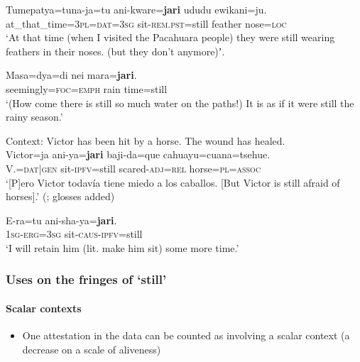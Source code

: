 \begin{exe}
	\ex\label{exAppendixCavinena1}
	\gll Tumepatya=tuna-ja=tu ani-kware=\textbf{jari} ududu ewikani=ju.\\
	at\_that\_time=3\textsc{pl}=\textsc{dat}=3\textsc{sg} sit-\textsc{rem}.\textsc{pst}=still feather nose=\textsc{loc}\\
	\glt \lq At that time (when I visited the Pacahuara people) they were still wearing feathers in their noses. (but they don’t anymore)ʼ. \parencite[590]{Guillaume2008}
	
	\ex\label{exAppendixCavinena2}
	 \gll Masa=dya=di nei mara=\textbf{jari}.\\
	seemingly=\textsc{foc}=\textsc{emph} rain time=still\\
	\glt \lq (How come there is still so much water on the paths!) It is as if it were still the rainy season.' \parencite[636]{Guillaume2008}

	\ex\label{exAppendixCavinena3}
Context: Victor has been hit by a horse. The wound has healed.\\
\gll Victor=ja ani-ya=\textbf{jari} baji-da=que cahuayu=cuana=tsehue.\\
V.=\textsc{dat}|\textsc{gen} sit-\textsc{ipfv}=still scared-\textsc{adj}=\textsc{rel} horse=\textsc{pl}=\textsc{assoc}\\
\glt \lq[P]ero Victor todavía tiene miedo a los caballos. [But Victor is still afraid of horses].\rq{ }(\cite[6, 9]{CampLiccardi1973}; glosses added)

	\ex\label{exAppendixCavinena4}
	\gll E-ra=tu ani-sha-ya=\textbf{jari}.\\
	1\textsc{sg}-\textsc{erg}=3\textsc{sg} sit-\textsc{caus}-\textsc{ipfv}=still\\
	\glt \lq I will retain him (lit. make him sit) some more time.\rq{ }\parencite[289]{Guillaume2008}
\end{exe}

\subsubsection{Uses on the fringes of \lq{}still\rq{}}

\paragraph{Scalar contexts}\label{appendixCavinenaScalar}
\begin{itemize}
	\item One attestation in the data can be counted as involving a scalar context (a decrease on a scale of aliveness)
\end{itemize}

